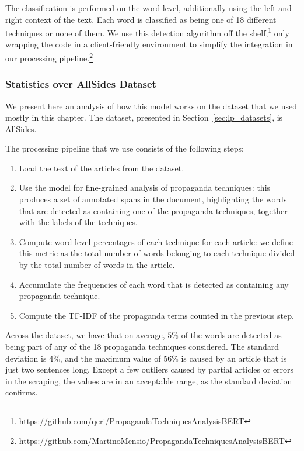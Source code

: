 The classification is performed on the word level, additionally using the left and right context of the text. Each word is classified as being one of 18 different techniques or none of them.
We use this detection algorithm off the shelf,\footnote{\url{https://github.com/qcri/PropagandaTechniquesAnalysisBERT}} only wrapping the code in a client-friendly environment to simplify the integration in our processing pipeline.\footnote{\url{https://github.com/MartinoMensio/PropagandaTechniquesAnalysisBERT}}


\subsubsection{\statusgreen Statistics over AllSides Dataset}
\label{ssec:lp_techniques_propaganda_stats}

We present here an analysis of how this model works on the dataset that we used mostly in this chapter.
The dataset, presented in Section~\ref{sec:lp_datasets}, is AllSides.

The processing pipeline that we use consists of the following steps:

\begin{enumerate}
    \item Load the text of the articles from the dataset.
    \item Use the model for fine-grained analysis of propaganda techniques: this produces a set of annotated spans in the document, highlighting the words that are detected as containing one of the propaganda techniques, together with the labels of the techniques.
    \item Compute word-level percentages of each technique for each article: we define this metric as the total number of words belonging to each technique divided by the total number of words in the article.
    \item Accumulate the frequencies of each word that is detected as containing any propaganda technique.
    \item Compute the TF-IDF of the propaganda terms counted in the previous step.
\end{enumerate}



Across the dataset, we have that on average, $5\%$ of the words are detected as being part of any of the 18 propaganda techniques considered.
The standard deviation is $4\%$, and the maximum value of $56\%$ is caused by an article that is just two sentences long. Except a few outliers caused by partial articles or errors in the scraping, the values are in an acceptable range, as the standard deviation confirms.

